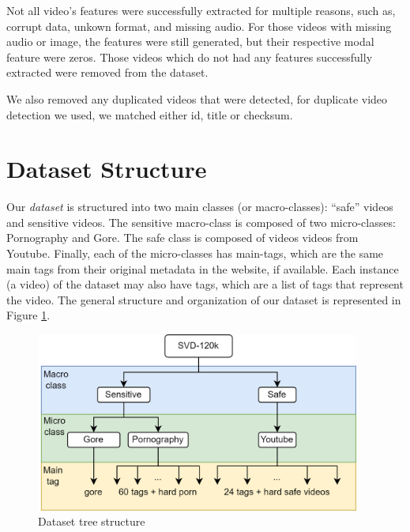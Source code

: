 Not all video's features were successfully extracted for multiple reasons, such as, corrupt data, unkown format, and missing audio. For those videos with missing audio or image, the features were still generated, but their respective modal feature were zeros. Those videos which do not had any features successfully extracted were removed from the dataset.

We also removed any duplicated videos that were detected, for duplicate video detection we used, we matched either id, title or checksum. 

\section{Dataset Structure}\label{sec:dataset-structure}

Our \textit{dataset} is structured into two main classes (or macro-classes): ``safe'' videos and sensitive videos. The sensitive macro-class is composed of two micro-classes: Pornography and Gore. The safe class is composed of videos videos from Youtube. Finally, each of the micro-classes has main-tags, which are the same main tags from their original metadata in the website, if available. Each instance (a video) of the dataset may also have tags, which are a list of tags that represent the video. The general structure and organization of our dataset is represented in Figure \ref{fig:dataset-structure}.

\begin{figure}[!ht]
    \centering
    \includegraphics[width=0.95\textwidth]{img/dataset/Dataset-Structure-color.png}
    \caption{Dataset tree structure}
    \label{fig:dataset-structure}
\end{figure}



